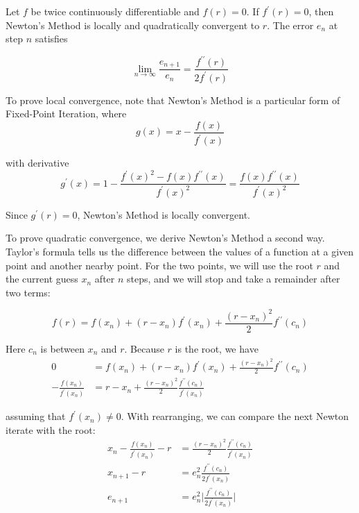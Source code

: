 \documentclass[a4paper,11pt]{report}
\begin{document}
\begin{enumerate}
    Let $f$ be twice continuously differentiable and $f(r) = 0$. If $f^{\prime}(r) = 0$, then Newton's Method is locally and quadratically convergent to $r$. The error $e_{n}$ at step $n$ satisfies

    \begin{equation*}
    \lim_{n \rightarrow \infty} \frac{e_{n+1}}{e_{n}} = \frac{f^{\prime\prime}(r)}{2f^{\prime}(r)}
    \end{equation*}

    To prove local convergence, note that Newton's Method is a particular form 
    of Fixed-Point Iteration, where
    \begin{equation*}
    g(x) = x - \frac{f(x)}{f^{\prime}(x)}
    \end{equation*}

    with derivative
    \begin{equation*}
    g^{\prime}(x) = 1 - \frac{f^{\prime}(x)^{2} - f(x) f^{\prime\prime}(x)}{f^{\prime}(x)^{2}} = \frac{f(x) f^{\prime\prime}(x)}{f^{\prime}(x)^{2}}
    \end{equation*}

    Since $g^{\prime}(r) = 0$, Newton's Method is locally convergent.
    
    To prove quadratic convergence, we derive Newton's Method a second way.
    Taylor's formula tells us the difference between the values of a function at
    a given point and another nearby point. For the two points, we will use the
    root $r$ and the current guess $x_{n}$ after $n$ steps, and we will stop and
    take a remainder after two terms:
    
    \begin{equation*}
    f(r) = f(x_{n}) + (r-x_{n})f^{\prime}(x_{n}) + \frac{(r-x_{n})^{2}}{2}f^{\prime\prime}(c_{n}) 
    \end{equation*}
 
    Here $c_{n}$ is between $x_{n}$ and $r$. Because $r$ is the root, we have
    \begin{equation*}
    \begin{aligned}
    0 &= f(x_{n}) + (r-x_{n})f^{\prime}(x_{n}) + \frac{(r-x_{n})^{2}}{2}f^{\prime\prime}(c_{n}) \\
    - \frac{f(x_{n})}{f^{\prime}(x_{n})} &= r - x_{n} + \frac{(r-x_{n})^{2}}{2} \frac{f^{\prime\prime}(c_{n})}{f^{\prime}(x_{n})}
    \end{aligned}
    \end{equation*}

    assuming that $f^{\prime}(x_{n}) \neq 0$. With rearranging, we can compare
    the next Newton iterate with the root:
    \begin{equation*}
    \begin{aligned}
    x_{n} - \frac{f(x_{n})}{f^{\prime}(x_{n})} - r &= \frac{(r-x_{n})^{2}}{2} \frac{f^{\prime\prime}(c_{n})}{f^{\prime}(x_{n})} \\
    x_{n+1} - r &= e_{n}^{2} \frac{f^{\prime\prime}(c_{n})}{2f^{\prime}(x_{n})} \\
    e_{n+1} &= e_{n}^{2} \Bigg| \frac{f^{\prime\prime}(c_{n})}{2f^{\prime}(x_{n})} \Bigg|
    \end{aligned}
    \end{equation*} 


\end{enumerate}
\end{document}
